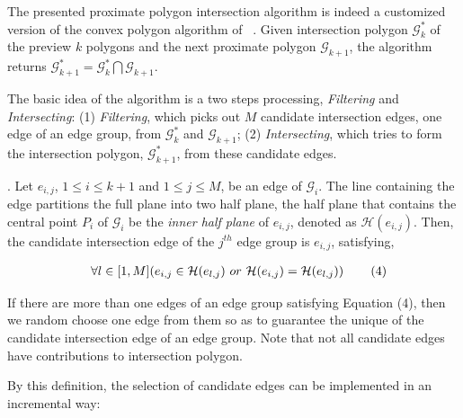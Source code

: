 The presented proximate polygon intersection algorithm is indeed a customized version of the convex polygon algorithm of ~\cite{ORourke:Intersection}.
%
Given intersection polygon $\mathcal{G}^*_k$ of the preview $k$ polygons and the next proximate polygon $\mathcal{G}_{k+1}$, the algorithm returns $\mathcal{G}^*_{k+1} = \mathcal{G}^*_k  \bigcap \mathcal{G}_{k+1}$.

The basic idea of the algorithm is a two steps processing, \ie \emph{Filtering} and \emph{Intersecting}:
 (1) \emph{Filtering}, which picks out $M$ candidate intersection edges, one edge of an edge group, from $\mathcal{G}^*_k $ and $\mathcal{G}_{k+1}$;
 (2) \emph{Intersecting}, which tries to form the intersection polygon, \ie $\mathcal{G}^*_{k+1}$, from these candidate edges.



.
Let $e_{i,j}$, $1 \le i \le k+1$ and $1 \le j \le M$, be an edge of $\mathcal{G}_{i}$. The line containing the edge partitions the full plane into two half plane, the half plane that contains the central point $P_i$ of $\mathcal{G}_i$ be the \emph{inner half plane} of $e_{i,j}$, denoted as $\mathcal{H}(e_{i,j})$.
%
Then, the candidate intersection edge of the $j^{th}$ edge group is $e_{i,j}$, satisfying,

\vspace{-2ex}
\begin{equation*}
\label{equ-inter-edge}
    \begin{aligned}
        \hspace{2ex}  \forall l \in [1, M] (e_{i,j} \in \mathcal{H}(e_{l,j}) ~or~ \mathcal{H}(e_{i,j}) = \mathcal{H}(e_{l,j}) )    \hspace{5ex} (4)\\
    \end{aligned}
\end{equation*}
\vspace{-2ex}


If there are more than one edges of an edge group satisfying Equation (4), then we random choose one edge from them so as to guarantee the unique of the candidate intersection edge of an edge group. Note that not all candidate edges have contributions to intersection polygon.


By this definition, the selection of candidate edges can be implemented in an incremental way:

